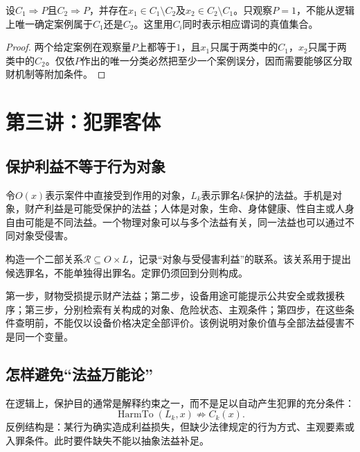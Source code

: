 \begin{modelprop}[共同条件不能区分罪名]
设$C_1\Rightarrow P$且$C_2\Rightarrow P$，并存在$x_1\in C_1\setminus C_2$及$x_2\in C_2\setminus C_1$。只观察$P=1$，不能从逻辑上唯一确定案例属于$C_1$还是$C_2$。这里用$C_i$同时表示相应谓词的真值集合。
\end{modelprop}
\begin{proof}
两个给定案例在观察量$P$上都等于$1$，且$x_1$只属于两类中的$C_1$，$x_2$只属于两类中的$C_2$。仅依$P$作出的唯一分类必然把至少一个案例误分，因而需要能够区分取财机制等附加条件。
\end{proof}

\section{第三讲：犯罪客体}
\subsection{保护利益不等于行为对象}
令$O(x)$表示案件中直接受到作用的对象，$L_k$表示罪名$k$保护的法益。手机是对象，财产利益是可能受保护的法益；人体是对象，生命、身体健康、性自主或人身自由可能是不同法益。一个物理对象可以与多个法益有关，同一法益也可以通过不同对象受侵害。

构造一个二部关系$\mathcal R\subseteq O\times L$，记录“对象与受侵害利益”的联系。该关系用于提出候选罪名，不能单独得出罪名。定罪仍须回到分则构成。

第一步，财物受损提示财产法益；第二步，设备用途可能提示公共安全或救援秩序；第三步，分别检索有关构成的对象、危险状态、主观条件；第四步，在这些条件查明前，不能仅以设备价格决定全部评价。该例说明对象价值与全部法益侵害不是同一个变量。

\subsection{怎样避免“法益万能论”}
在逻辑上，保护目的通常是解释约束之一，而不是足以自动产生犯罪的充分条件：
\[
 \operatorname{HarmTo}(L_k,x)
 \not\Rightarrow C_k(x).
\]
反例结构是：某行为确实造成利益损失，但缺少法律规定的行为方式、主观要素或入罪条件。此时要件缺失不能以抽象法益补足。


